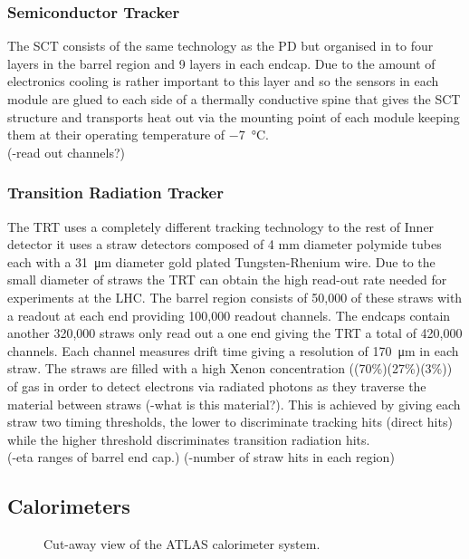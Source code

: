 		\subsubsection*{Semiconductor Tracker}

		The SCT consists of the same technology as the PD but organised in to four layers in the barrel region and 9 layers in each endcap. Due to the amount of electronics cooling is rather important to this layer and so the sensors in each module are glued to each side of a thermally conductive spine that gives the SCT structure and transports heat out via the mounting point of each module keeping them at their operating temperature of \SI{-7}{\degreeCelsius}.\\
		(-read out channels?)



		\subsubsection*{Transition Radiation Tracker}

		The TRT uses a completely different tracking technology to the rest of Inner detector it uses a straw detectors composed of 4 mm diameter polymide tubes each with a \SI{31}{\um} diameter gold plated Tungsten-Rhenium wire. Due to the small diameter of straws the TRT can obtain the high read-out rate needed for experiments at the LHC. The barrel region consists of 50,000 of these straws with a readout at each end providing 100,000 readout channels. The endcaps contain another 320,000 straws only read out a one end giving the TRT a total of 420,000 channels. Each channel measures drift time giving a resolution of \SI{170}{\um} in each straw. The straws are filled with a high Xenon concentration ((70\%)(27\%)(3\%)) of gas in order to detect electrons via radiated photons as they traverse the material between straws (-what is this material?). This is achieved by giving each straw two timing thresholds, the lower to discriminate tracking hits (direct hits) while the higher threshold discriminates transition radiation hits. \\
		(-eta ranges of barrel end cap.)
		(-number of straw hits in each region) 
		



	\subsection{Calorimeters}

		\begin{figure}[h]
			\begin{center}
			\end{center}
			\caption{Cut-away view of the ATLAS calorimeter system.}
			\label{fig:ATLAS_calo}
		\end{figure}

